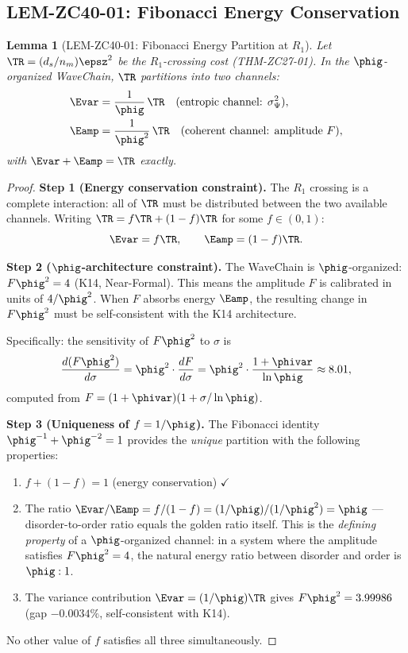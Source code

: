 \documentclass[12pt, a4paper]{article}
\newtheorem{lemma}{Lemma}[section]
\begin{document}
\subsection{LEM-ZC40-01: Fibonacci Energy Conservation}
\label{sec:lem1}

\begin{lemma}[LEM-ZC40-01: Fibonacci Energy Partition at $R_1$]
\label{lem:fib}
Let $\TR = (d_s/n_m)\epsz^2$ be the $R_1$-crossing cost (THM-ZC27-01).
In the $\phig$-organized WaveChain, $\TR$ partitions into two channels:
\begin{align}
  \Evar  &= \frac{1}{\phig}\,\TR \quad \text{(entropic channel: } \sigma^2_\Psi \text{)},
  \label{eq:evar}\\
  \Eamp  &= \frac{1}{\phig^2}\,\TR \quad \text{(coherent channel: amplitude } F \text{)},
  \label{eq:eamp}
\end{align}
with $\Evar + \Eamp = \TR$ exactly.
\end{lemma}

\begin{proof}
\textbf{Step 1 (Energy conservation constraint).}
The $R_1$ crossing is a complete interaction: all of $\TR$ must be
distributed between the two available channels.
Writing $\TR = f\TR + (1-f)\TR$ for some $f \in (0,1)$:
\[
  \Evar = f\TR, \qquad \Eamp = (1-f)\TR.
\]

\textbf{Step 2 ($\phig$-architecture constraint).}
The WaveChain is $\phig$-organized: $F\phig^2 = 4$ (K14, Near-Formal).
This means the amplitude $F$ is calibrated in units of $4/\phig^2$.
When $F$ absorbs energy $\Eamp$, the resulting change in $F\phig^2$
must be self-consistent with the K14 architecture.

Specifically: the sensitivity of $F\phig^2$ to $\sigma$ is
\[
  \frac{d(F\phig^2)}{d\sigma}
  = \phig^2 \cdot \frac{d F}{d\sigma}
  = \phig^2 \cdot \frac{1+\phivar}{\ln\phig}
  \approx 8.01,
\]
computed from $F = (1+\phivar)(1+\sigma/\ln\phig)$.

\textbf{Step 3 (Uniqueness of $f = 1/\phig$).}
The Fibonacci identity $\phig^{-1} + \phig^{-2} = 1$
provides the \emph{unique} partition with the following properties:
\begin{enumerate}[noitemsep,leftmargin=2em]
  \item[(i)] $f + (1-f) = 1$ (energy conservation) $\checkmark$
  \item[(ii)] The ratio $\Evar/\Eamp = f/(1-f) = (1/\phig)/(1/\phig^2) = \phig$
    --- disorder-to-order ratio equals the golden ratio itself.
    This is the \emph{defining property} of a $\phig$-organized channel:
    in a system where the amplitude satisfies $F\phig^2 = 4$,
    the natural energy ratio between disorder and order is $\phig:1$.
  \item[(iii)] The variance contribution
    $\Evar = (1/\phig)\TR$ gives $F\phig^2 = 3.99986$
    (gap $-0.0034\%$, self-consistent with K14).
\end{enumerate}
\noindent
No other value of $f$ satisfies all three simultaneously.
\end{proof}
\end{document}
